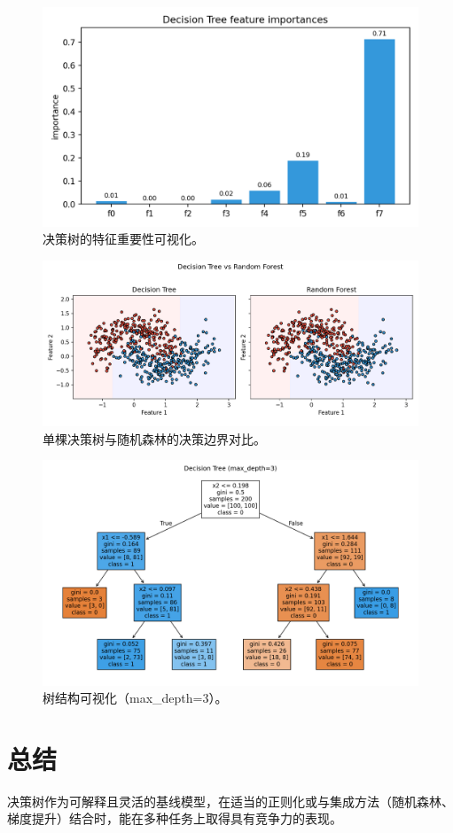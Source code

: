 \documentclass[UTF8,zihao=-4]{ctexart}
\begin{document}
\begin{figure}[H]
  \centering
  \includegraphics[width=0.85\linewidth]{dt_feature_importances.png}
  \caption{决策树的特征重要性可视化。}
  \label{fig:fi_cn}
\end{figure}
\FloatBarrier

\begin{figure}[H]
  \centering
  \includegraphics[width=0.95\linewidth]{dt_vs_rf_boundary.png}
  \caption{单棵决策树与随机森林的决策边界对比。}
  \label{fig:dt_vs_rf_cn}
\end{figure}
\FloatBarrier

\begin{figure}[H]
  \centering
  \includegraphics[width=0.95\linewidth]{dt_tree_plot.png}
  \caption{树结构可视化（max\_depth=3）。}
  \label{fig:treeplot_cn}
\end{figure}
\FloatBarrier

\section{总结}
决策树作为可解释且灵活的基线模型，在适当的正则化或与集成方法（随机森林、梯度提升）结合时，能在多种任务上取得具有竞争力的表现。
\end{document}
